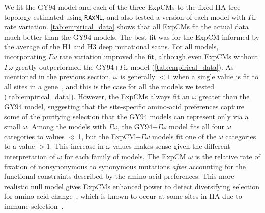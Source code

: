 \documentclass[11pt]{article}
\begin{document}
We fit the GY94 model and each of the three ExpCMs to the fixed HA tree topology estimated using \texttt{RAxML}, and also tested a version of each model with $\Gamma\omega$ rate variation.
\ref{tab:empirical_data} shows that all ExpCMs fit the actual data much better than the GY94 models.
The best fit was for the ExpCM informed by the average of the H1 and H3 deep mutational scans.
For all models, incorporating $\Gamma\omega$ rate variation improved the fit, although even ExpCMs without $\Gamma\omega$ greatly outperformed the GY94+$\Gamma\omega$ model (\ref{tab:empirical_data}).
As mentioned in the previous section, $\omega$ is generally $<1$ when a single value is fit to all sites in a gene~\citep{murrell2015gene}, and this is the case for all the models we tested (\ref{tab:empirical_data}).
However, the ExpCMs always fit an $\omega$ greater than the GY94 model, suggesting that the site-specific amino-acid preferences capture some of the purifying selection that the GY94 models can represent only via a small $\omega$.
Among the models with $\Gamma\omega$, the GY94+$\Gamma\omega$ model fits all four $\omega$ categories to values $\ll$1, but the ExpCM+$\Gamma\omega$ models fit one of the $\omega$ categories to a value $>1$.
This increase in $\omega$ values makes sense given the different interpretation of $\omega$ for each family of models. 
The ExpCM $\omega$ is the relative rate of fixation of nonsynonymous to synonymous mutations \textit{after} accounting for the functional constraints described by the amino-acid preferences.
This more realistic null model gives ExpCMs enhanced power to detect diversifying selection for amino-acid change~\citep{bloom2017identification, rodrigue2017detecting}, which is known to occur at some sites in HA due to immune selection~\citep{bedford2014integrating}.
\end{document}
